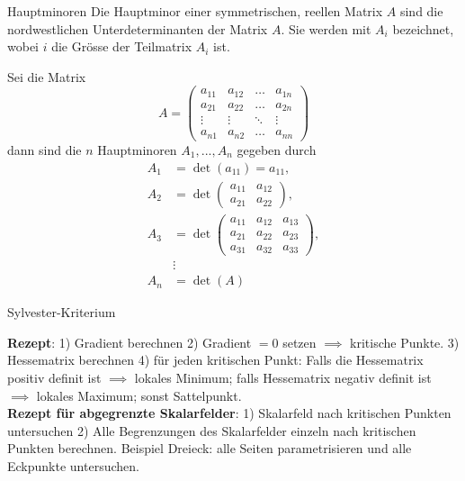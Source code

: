 \begin{Definition}{Hauptminoren}{}
	Die Hauptminor einer symmetrischen, reellen Matrix $A$ sind die nordwestlichen Unterdeterminanten der Matrix $A$. Sie werden mit $A_i$ bezeichnet, wobei $i$ die Grösse der Teilmatrix $A_i$ ist. 
	
	Sei die Matrix
	\[
		A = \begin{pmatrix}
            a_{11} & a_{12} & \hdots & a_{1n}\\
            a_{21} & a_{22} & \hdots & a_{2n}\\
            \vdots & \vdots & \ddots & \vdots\\
            a_{n1} & a_{n2} & \hdots & a_{nn}
        \end{pmatrix}
	\]
	dann sind die $n$ Hauptminoren $A_1, ..., A_n$ gegeben durch
	\begin{align*}
		A_1 &= \det(a_{11}) = a_{11},\\
		A_2 &= \det\begin{pmatrix}
            a_{11} & a_{12} \\
            a_{21} & a_{22}
            \end{pmatrix},\\
       	A_3 &= \det\begin{pmatrix}
            a_{11} & a_{12} & a_{13} \\
            a_{21} & a_{22}& a_{23}\\
            a_{31} & a_{32}& a_{33}
            \end{pmatrix},\\
            &\vdots\\
        A_n &= \det(A)
    \end{align*}
\end{Definition}

\begin{Satz}{Sylvester-Kriterium}{}
	
\end{Satz}

\textbf{Rezept}: 1) Gradient berechnen 2) Gradient $=0$ setzen $\implies$ kritische Punkte. 3) Hessematrix berechnen 4) für jeden kritischen Punkt: Falls die Hessematrix positiv definit ist $\implies$ lokales Minimum; falls Hessematrix negativ definit ist $\implies$ lokales Maximum; sonst Sattelpunkt.\\

\textbf{Rezept für abgegrenzte Skalarfelder}: 1) Skalarfeld nach kritischen Punkten untersuchen 2) Alle Begrenzungen des Skalarfelder einzeln nach kritischen Punkten berechnen. Beispiel Dreieck: alle Seiten parametrisieren und alle Eckpunkte untersuchen.

